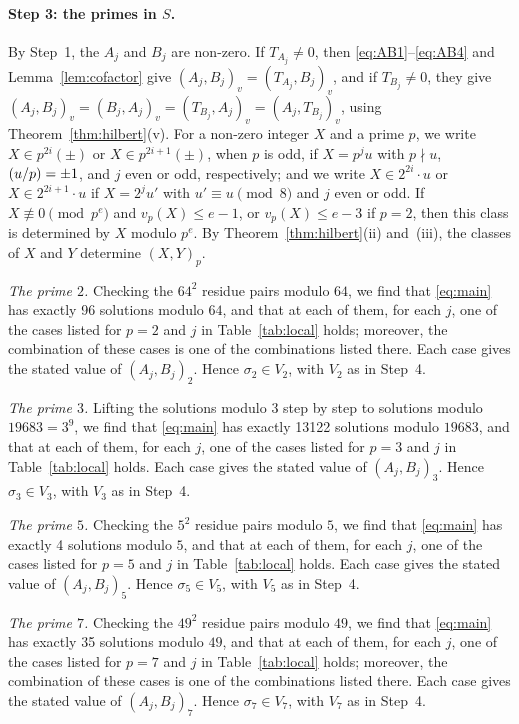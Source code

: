 \documentclass[11pt]{article}
\newcommand{\leg}[2]{\mathchoice{\biggl(\dfrac{#1}{#2}\biggr)}{(#1/#2)}{(#1/#2)}{(#1/#2)}}
\begin{document}
\paragraph{Step 3: the primes in $S$.} By Step~1, the $A_j$ and $B_j$ are non-zero. If $T_{A_j}\neq0$, then \eqref{eq:AB1}--\eqref{eq:AB4} and Lemma~\ref{lem:cofactor} give $(A_j,B_j)_v=(T_{A_j},B_j)_v$, and if $T_{B_j}\neq0$, they give $(A_j,B_j)_v=(B_j,A_j)_v=(T_{B_j},A_j)_v=(A_j,T_{B_j})_v$, using Theorem~\ref{thm:hilbert}(v). For a non-zero integer $X$ and a prime $p$, we write $X\in p^{2i}(\pm)$ or $X\in p^{2i+1}(\pm)$, when $p$ is odd, if $X=p^ju$ with $p\nmid u$, $\leg{u}{p}=\pm1$, and $j$ even or odd, respectively; and we write $X\in2^{2i}\cdot u$ or $X\in2^{2i+1}\cdot u$ if $X=2^ju'$ with $u'\equiv u\pmod 8$ and $j$ even or odd. If $X\not\equiv0\pmod{p^e}$ and $v_p(X)\leq e-1$, or $v_p(X)\leq e-3$ if $p=2$, then this class is determined by $X$ modulo $p^e$. By Theorem~\ref{thm:hilbert}(ii) and~(iii), the classes of $X$ and $Y$ determine $(X,Y)_p$.

\emph{The prime $2$.} Checking the $64^2$ residue pairs modulo $64$, we find that \eqref{eq:main} has exactly 96 solutions modulo $64$, and that at each of them, for each $j$, one of the cases listed for $p=2$ and $j$ in Table~\ref{tab:local} holds; moreover, the combination of these cases is one of the combinations listed there. Each case gives the stated value of $(A_j,B_j)_{2}$. Hence $\sigma_{2}\in V_{2}$, with $V_{2}$ as in Step~4.

\emph{The prime $3$.} Lifting the solutions modulo $3$ step by step to solutions modulo $19683=3^{9}$, we find that \eqref{eq:main} has exactly 13122 solutions modulo $19683$, and that at each of them, for each $j$, one of the cases listed for $p=3$ and $j$ in Table~\ref{tab:local} holds. Each case gives the stated value of $(A_j,B_j)_{3}$. Hence $\sigma_{3}\in V_{3}$, with $V_{3}$ as in Step~4.

\emph{The prime $5$.} Checking the $5^2$ residue pairs modulo $5$, we find that \eqref{eq:main} has exactly 4 solutions modulo $5$, and that at each of them, for each $j$, one of the cases listed for $p=5$ and $j$ in Table~\ref{tab:local} holds. Each case gives the stated value of $(A_j,B_j)_{5}$. Hence $\sigma_{5}\in V_{5}$, with $V_{5}$ as in Step~4.

\emph{The prime $7$.} Checking the $49^2$ residue pairs modulo $49$, we find that \eqref{eq:main} has exactly 35 solutions modulo $49$, and that at each of them, for each $j$, one of the cases listed for $p=7$ and $j$ in Table~\ref{tab:local} holds; moreover, the combination of these cases is one of the combinations listed there. Each case gives the stated value of $(A_j,B_j)_{7}$. Hence $\sigma_{7}\in V_{7}$, with $V_{7}$ as in Step~4.
\end{document}
